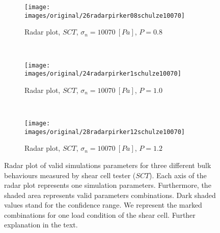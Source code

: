 \begin{figure}[htp] \centering
        \begin{subfigure}[b]{0.5\columnwidth}
        \texttt{[image: images/original/26radarpirker08schulze10070]}
        \caption{Radar plot, $SCT$, $\sigma_n=10070 ~[Pa]$, $P=0.8$}
        \label{fig:26radarpirker08schulze10070} 
    \end{subfigure}\\
     \begin{subfigure}[b]{0.5\columnwidth}
        \texttt{[image: images/original/24radarpirker1schulze10070]}
        \caption{Radar plot, $SCT$, $\sigma_n=10070 ~[Pa]$, $P=1.0$}
        \label{fig:24radarpirker1schulze10070}
    \end{subfigure} \\
        \begin{subfigure}[b]{0.5\columnwidth}
        \texttt{[image: images/original/28radarpirker12schulze10070]}
        \caption{Radar plot, $SCT$, $\sigma_n=10070 ~[Pa]$, $P=1.2$}
        \label{fig:28radarpirker12schulze10070} 
    \end{subfigure}
    \caption[Radar plot of valid simulations parameters for three different
    bulk behaviours measured by SCT]{Radar plot of valid simulations parameters for three different
    bulk behaviours measured by shear cell tester ($SCT$).
    Each axis of the radar plot represents one simulation parameters.
    Furthermore, the shaded area represents valid parameters combinations.
    Dark shaded values stand for the confidence range.
    We represent the marked combinations for one load condition of the shear
    cell.
    Further explanation in the text.
   }
    \label{fig:29schulzeradarandcloud}
\end{figure}